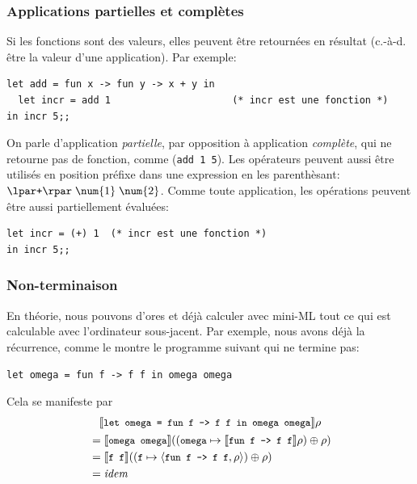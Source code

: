 %
\begin{frame}[containsverbatim]
\frametitle{Applications partielles et complètes}
\label{application_partielle}

Si les fonctions sont des valeurs, elles peuvent être retournées en
résultat (c.-à-d. être la valeur d'une application). Par exemple:
{\small
\begin{verbatim}
let add = fun x -> fun y -> x + y in
  let incr = add 1                     (* incr est une fonction *)
in incr 5;;
\end{verbatim}
} On parle d'application \emph{partielle}, par opposition à
application \emph{complète}, qui ne retourne pas de fonction, comme
(\verb|add 1 5|). Les opérateurs peuvent aussi être utilisés en
position préfixe dans une expression en les parenthèsant:
$\lpar\texttt{+}\rpar \; \num{1} \; \num{2}$. Comme toute application,
les opérations peuvent être aussi partiellement évaluées: {\small
\begin{verbatim}
let incr = (+) 1  (* incr est une fonction *)
in incr 5;;
\end{verbatim}
}

\end{frame}

%
\begin{frame}[containsverbatim]
\frametitle{Non-terminaison}

En théorie, nous pouvons d'ores et déjà calculer avec mini-ML
tout ce qui est calculable avec l'ordinateur sous-jacent. Par exemple,
nous avons déjà la récurrence, comme le montre le programme suivant
qui ne termine pas:
\begin{center}
\verb|let omega = fun f -> f f in omega omega|
\end{center}
Cela se manifeste par
\begin{gather*}
\llbracket{\texttt{\small let omega = fun f -> f f in omega omega}}\rrbracket{\rho}\\
\begin{align*}
&= \llbracket{\texttt{\small omega omega}}\rrbracket{((\texttt{\small omega} \mapsto
\llbracket{\texttt{\small fun f -> f f}}\rrbracket{\rho}) \oplus \rho)}\\
&= \llbracket{\texttt{\small f f}}\rrbracket{((\texttt{\small f} \mapsto
    \langle\texttt{\small fun f -> f f},\rho\rangle) \oplus \rho)}\\
&= \textnormal{\emph{idem}}
\end{align*}
\end{gather*}

\end{frame}

